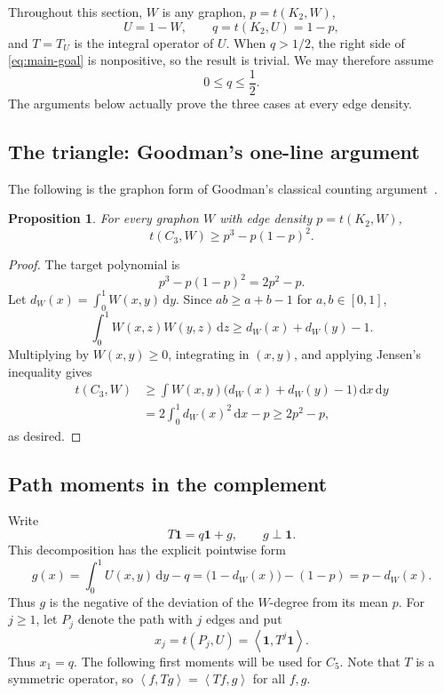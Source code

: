 ﻿\documentclass[11pt]{article}
\newtheorem{proposition}[theorem]{Proposition}
\numberwithin{equation}{section}
\newcommand{\one}{\mathbf 1}
\newcommand{\ip}[2]{\left\langle #1,#2\right\rangle}
\newcommand{\dd}{\,\mathrm d}
\begin{document}
Throughout this section, $W$ is any graphon, $p=t(K_2,W)$,
\[
  U=1-W,\qquad q=t(K_2,U)=1-p,
\]
and $T=T_U$ is the integral operator of $U$.
When $q>1/2$, the right side of \eqref{eq:main-goal} is nonpositive, so the result is trivial.
We may therefore assume
\begin{equation}\label{eq:q-short}
  0\le q\le\frac{1}{2}.
\end{equation}
The arguments below actually prove the three cases at every edge density.

\subsection{The triangle: Goodman's one-line argument}\label{subsec:C3}

The following is the graphon form of Goodman's classical counting argument~\cite{Goodman1959}.

\begin{proposition}\label{prop:C3}
  For every graphon $W$ with edge density $p=t(K_2,W)$,
  \[
    t(C_3,W)\ge p^3-p(1-p)^2.
  \]
\end{proposition}

\begin{proof}
  The target polynomial is
  \[
    p^3-p(1-p)^2=2p^2-p.
  \]
  Let $d_W(x)=\int_0^1W(x,y)\dd y$.
  Since $ab\ge a+b-1$ for $a,b\in[0,1]$,
  \[
    \int_0^1W(x,z)W(y,z)\dd z\ge d_W(x)+d_W(y)-1.
  \]
  Multiplying by $W(x,y)\ge0$, integrating in $(x,y)$, and applying Jensen's inequality gives
  \begin{align*}
    t(C_3,W)
    &\ge \int W(x,y)\bigl(d_W(x)+d_W(y)-1\bigr)\dd x\dd y\\
    &=2\int_0^1d_W(x)^2\dd x-p
    \ge2p^2-p,
  \end{align*}
  as desired.
\end{proof}

\subsection{Path moments in the complement}\label{subsec:path-moments}

Write
\begin{equation}\label{eq:T1-decomp}
  T\one=q\one+g,
  \qquad g\perp\one.
\end{equation}
This decomposition has the explicit pointwise form
\[
  g(x)=\int_0^1U(x,y)\dd y-q
  =\bigl(1-d_W(x)\bigr)-(1-p)
  =p-d_W(x).
\]
Thus $g$ is the negative of the deviation of the $W$-degree from its mean $p$.
For $j\ge1$, let $P_j$ denote the path with $j$ edges and put
\[
  x_j=t(P_j,U)=\ip{\one}{T^j\one}.
\]
Thus $x_1=q$.
The following first moments will be used for $C_5$.
Note that $T$ is a symmetric operator, so $\ip{f}{Tg}=\ip{Tf}{g}$ for all $f,g$.
\end{document}
